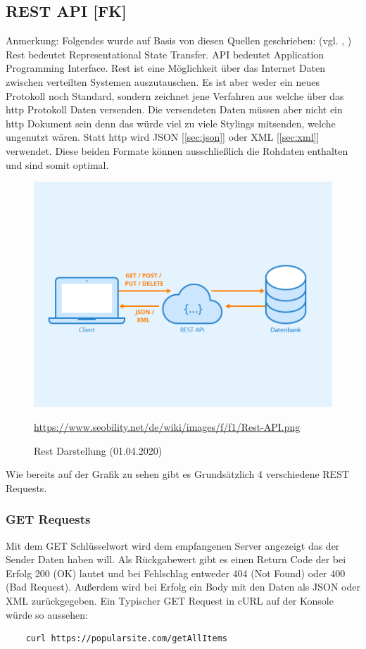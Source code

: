 \subsection{REST API [FK]} \label{sec:REST} 
Anmerkung: Folgendes wurde auf Basis von diesen Quellen geschrieben: (vgl. \cite{RestApi}, \cite{RestKonzept})
Rest bedeutet Representational State Transfer. API bedeutet Application Programming Interface.
Rest ist eine Möglichkeit über das Internet Daten zwischen verteilten Systemen auszutauschen. Es ist aber weder ein neues Protokoll noch Standard, sondern zeichnet jene Verfahren aus welche über das http Protokoll Daten versenden. Die versendeten Daten müssen aber nicht ein http Dokument sein denn das würde viel zu viele Stylings mitsenden, welche ungenutzt wären. Statt http wird JSON [\ref{sec:json}] oder XML [\ref{sec:xml}] verwendet. Diese beiden Formate können ausschließlich die Rohdaten enthalten und sind somit optimal. 
\begin{figure}[H]
    \includegraphics[scale=.9]{images/Rest-API.png}
    \caption{Rest Darstellung (01.04.2020)}
    \url{https://www.seobility.net/de/wiki/images/f/f1/Rest-API.png}
    \label{img:Rest}
\end{figure}
Wie bereits auf der Grafik zu sehen gibt es Grundsätzlich 4 verschiedene REST Requests. 
\subsubsection{GET Requests}
Mit dem GET Schlüsselwort wird dem empfangenen Server angezeigt das der Sender Daten haben will. Als Rückgabewert gibt es einen Return Code der bei Erfolg 200 (OK) lautet und bei Fehlschlag entweder 404 (Not Found) oder 400 (Bad Request). Außerdem wird bei Erfolg ein Body mit den Daten als JSON oder XML zurückgegeben.
Ein Typischer GET Request in cURL auf der Konsole würde so aussehen:
\begin{lstlisting}
    curl https://popularsite.com/getAllItems
\end{lstlisting}
